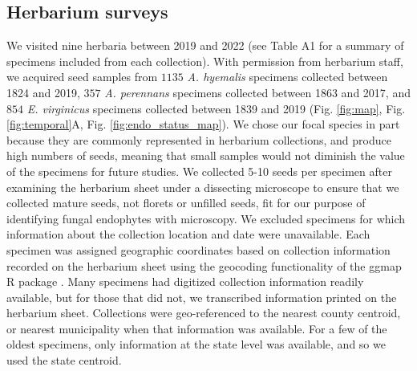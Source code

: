 \documentclass[11pt]{article}
\begin{document}
		\subsection*{Herbarium surveys}
We visited nine herbaria between 2019 and 2022 (see Table A1 for a summary of specimens included from each collection). 
With permission from herbarium staff, we acquired seed samples from $1135$ \emph{A. hyemalis} specimens collected between 1824 and 2019, $357$ \emph{A. perennans} specimens collected between 1863 and 2017, and $854$ \emph{E. virginicus} specimens collected between 1839 and 2019 (Fig. \ref{fig:map}, Fig. \ref{fig:temporal}A, Fig. \ref{fig:endo_status_map}).
We chose our focal species in part because they are commonly represented in herbarium collections, and produce high numbers of seeds, meaning that small samples would not diminish the value of the specimens for future studies. 
We collected 5-10 seeds per specimen after examining the herbarium sheet under a dissecting microscope to ensure that we collected mature seeds, not florets or unfilled seeds, fit for our purpose of identifying fungal endophytes with microscopy.
We excluded specimens for which information about the collection location and date were unavailable.
Each specimen was assigned geographic coordinates based on collection information recorded on the herbarium sheet using the geocoding functionality of the ggmap R package \citep{kahle2019package}.
Many specimens had digitized collection information readily available, but for those that did not, we transcribed information printed on the herbarium sheet. 
Collections were geo-referenced to the nearest county centroid, or nearest municipality when that information was available. 
For a few of the oldest specimens, only information at the state level was available, and so we used the state centroid.
\end{document}
